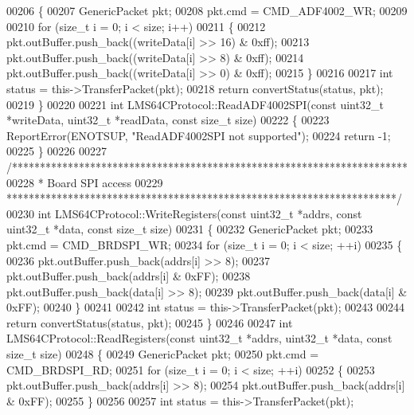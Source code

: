 \begin{DoxyCode}
00206 \{
00207     GenericPacket pkt;
00208     pkt.cmd = CMD_ADF4002_WR;
00209 
00210     \textcolor{keywordflow}{for} (\textcolor{keywordtype}{size\_t} i = 0; i < size; i++)
00211     \{
00212         pkt.outBuffer.push\_back((writeData[i] >> 16) & 0xff);
00213         pkt.outBuffer.push\_back((writeData[i] >> 8) & 0xff);
00214         pkt.outBuffer.push\_back((writeData[i] >> 0) & 0xff);
00215     \}
00216 
00217     \textcolor{keywordtype}{int} status = this->TransferPacket(pkt);
00218     \textcolor{keywordflow}{return} convertStatus(status, pkt);
00219 \}
00220 
00221 \textcolor{keywordtype}{int} LMS64CProtocol::ReadADF4002SPI(\textcolor{keyword}{const} uint32\_t *writeData, uint32\_t *readData, \textcolor{keyword}{const} \textcolor{keywordtype}{size\_t} 
      size)
00222 \{
00223     ReportError(ENOTSUP, \textcolor{stringliteral}{"ReadADF4002SPI not supported"});
00224     \textcolor{keywordflow}{return} -1;
00225 \}
00226 
00227 \textcolor{comment}{/***********************************************************************}
00228 \textcolor{comment}{ * Board SPI access}
00229 \textcolor{comment}{ **********************************************************************/}
00230 \textcolor{keywordtype}{int} LMS64CProtocol::WriteRegisters(\textcolor{keyword}{const} uint32\_t *addrs, \textcolor{keyword}{const} uint32\_t *data, \textcolor{keyword}{const} \textcolor{keywordtype}{size\_t} 
      size)
00231 \{
00232     GenericPacket pkt;
00233     pkt.cmd = CMD_BRDSPI_WR;
00234     \textcolor{keywordflow}{for} (\textcolor{keywordtype}{size\_t} i = 0; i < size; ++i)
00235     \{
00236         pkt.outBuffer.push\_back(addrs[i] >> 8);
00237         pkt.outBuffer.push\_back(addrs[i] & 0xFF);
00238         pkt.outBuffer.push\_back(data[i] >> 8);
00239         pkt.outBuffer.push\_back(data[i] & 0xFF);
00240     \}
00241 
00242     \textcolor{keywordtype}{int} status = this->TransferPacket(pkt);
00243 
00244     \textcolor{keywordflow}{return} convertStatus(status, pkt);
00245 \}
00246 
00247 \textcolor{keywordtype}{int} LMS64CProtocol::ReadRegisters(\textcolor{keyword}{const} uint32\_t *addrs, uint32\_t *data, \textcolor{keyword}{const} \textcolor{keywordtype}{size\_t} 
      size)
00248 \{
00249     GenericPacket pkt;
00250     pkt.cmd = CMD_BRDSPI_RD;
00251     \textcolor{keywordflow}{for} (\textcolor{keywordtype}{size\_t} i = 0; i < size; ++i)
00252     \{
00253         pkt.outBuffer.push\_back(addrs[i] >> 8);
00254         pkt.outBuffer.push\_back(addrs[i] & 0xFF);
00255     \}
00256 
00257     \textcolor{keywordtype}{int} status = this->TransferPacket(pkt);

\end{DoxyCode}
